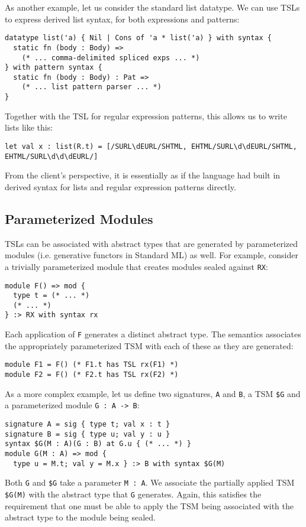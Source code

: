 As another example, let us consider the standard list datatype. We can use TSLs to express derived list syntax, for both expressions and patterns:
\begin{lstlisting}[numbers=none]
datatype list('a) { Nil | Cons of 'a * list('a) } with syntax {
  static fn (body : Body) => 
    (* ... comma-delimited spliced exps ... *)
} with pattern syntax {
  static fn (body : Body) : Pat => 
    (* ... list pattern parser ... *)
}
\end{lstlisting}
Together with the TSL for regular expression patterns, this allows us to write lists like this:
\begin{lstlisting}[numbers=none]
let val x : list(R.t) = [/SURL\dEURL/SHTML, EHTML/SURL\d\dEURL/SHTML, EHTML/SURL\d\d\dEURL/]
\end{lstlisting}
From the client's perspective, it is essentially as if the language had built in derived syntax for lists and regular expression patterns directly.%

\subsection{Parameterized Modules}
TSLs can be associated with abstract types that are generated by parameterized modules (i.e. generative functors in Standard ML) as well. For example, consider a trivially parameterized module that creates modules sealed against \lstinline{RX}:
\begin{lstlisting}[numbers=none]
module F() => mod {
  type t = (* ... *)
  (* ... *)
} :> RX with syntax rx 
\end{lstlisting}
Each application of \lstinline{F} generates a distinct abstract type. The semantics associates the appropriately parameterized TSM with each of these as they are generated:
\begin{lstlisting}[numbers=none]
module F1 = F() (* F1.t has TSL rx(F1) *)
module F2 = F() (* F2.t has TSL rx(F2) *)
\end{lstlisting}

As a more complex example, let us define two signatures, \lstinline{A} and \lstinline{B}, a TSM \texttt{\$G} and a parameterized module \lstinline{G : A -> B}:
\begin{lstlisting}[numbers=none,mathescape=|]
signature A = sig { type t; val x : t }
signature B = sig { type u; val y : u }
syntax $G(M : A)(G : B) at G.u { (* ... *) }
module G(M : A) => mod { 
  type u = M.t; val y = M.x } :> B with syntax $G(M)
\end{lstlisting}
Both \lstinline{G} and \texttt{\$G} take a parameter \lstinline{M : A}. We associate the partially applied TSM \texttt{\$G(M)} with the abstract type that \lstinline{G} generates. Again, this satisfies the requirement that one must be able to apply the TSM being associated with the abstract type to the module being sealed. 

